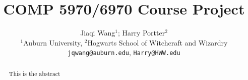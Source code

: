 \documentclass{article}
\title{COMP 5970/6970 Course Project}
\author{%
  Jiaqi Wang$^{1}$;  
  Harry Portter$^{2}$\\
  $^1$Auburn University, 
  $^2$Hogwarts School of Witchcraft and Wizardry\\
  \texttt{jqwang@auburn.edu}, \texttt{Harry@HWW.edu}\\
}
\begin{document}
\maketitle

\begin{abstract}
This is the abstract
\end{abstract}











\end{document}
